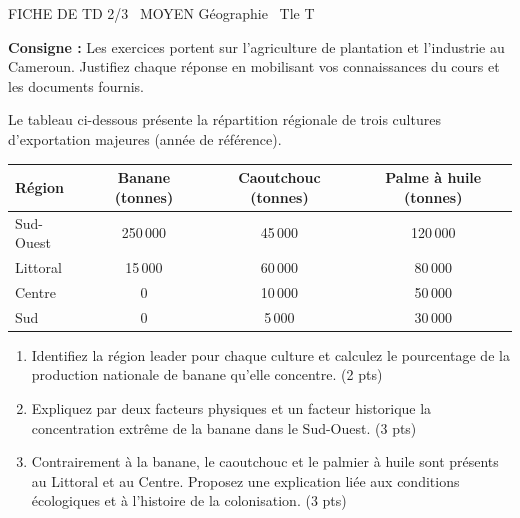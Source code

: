 \documentclass[11pt]{article}
\begin{document}
\begin{tcolorbox}[enhanced,colback=popink,colframe=popink,arc=10pt,boxrule=0pt,left=12pt,right=12pt,top=9pt,bottom=9pt]
{\color{white}\popxbold\small FICHE DE TD 2/3 \textbullet\ MOYEN \hfill Géographie \textbullet\ Tle T\par}
\end{tcolorbox}
\vspace{4pt}
\noindent\textbf{Consigne :} Les exercices portent sur l'agriculture de plantation et l'industrie au Cameroun. Justifiez chaque réponse en mobilisant vos connaissances du cours et les documents fournis.

\begin{exercice}
Le tableau ci-dessous présente la répartition régionale de trois cultures d'exportation majeures (année de référence).

\begin{center}
\begin{tabular}{|l|c|c|c|}
\hline
\textbf{Région} & \textbf{Banane (tonnes)} & \textbf{Caoutchouc (tonnes)} & \textbf{Palme à huile (tonnes)} \\
\hline
Sud-Ouest & 250\,000 & 45\,000 & 120\,000 \\
\hline
Littoral & 15\,000 & 60\,000 & 80\,000 \\
\hline
Centre & 0 & 10\,000 & 50\,000 \\
\hline
Sud & 0 & 5\,000 & 30\,000 \\
\hline
\end{tabular}
\end{center}

\begin{enumerate}
    \item Identifiez la région leader pour chaque culture et calculez le pourcentage de la production nationale de banane qu'elle concentre. (2 pts)
    \item Expliquez par deux facteurs physiques et un facteur historique la concentration extrême de la banane dans le Sud-Ouest. (3 pts)
    \item Contrairement à la banane, le caoutchouc et le palmier à huile sont présents au Littoral et au Centre. Proposez une explication liée aux conditions écologiques et à l'histoire de la colonisation. (3 pts)
\end{enumerate}
\end{exercice}
\end{document}
